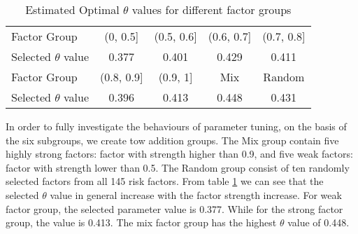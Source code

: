 \begin{table}[H]
	\centering
	\caption{Estimated Optimal $\theta$ values for different factor groups}
	\label{table:optimal_theta}
	\begin{tabular}{l|cccc}
		\hline
		\hline
		Factor Group            & (0, 0.5{]}   & (0.5, 0.6{]} & (0.6, 0.7{]} & (0.7, 0.8{]} \\ 
		Selected $\theta$ value & 0.377        & 0.401        & 0.429        & 0.411        \\ \hline
		Factor Group            & (0.8, 0.9{]} & (0.9, 1{]}   & Mix          & Random       \\ 
		Selected $\theta$ value & 0.396        & 0.413        & 0.448        & 0.431        \\ \hline
		\hline
	\end{tabular}
\end{table}
In order to fully investigate the behaviours of parameter tuning, on the basis of the six subgroups, we create tow addition groups.
The Mix group contain five highly strong factors: factor with strength higher than 0.9, and five weak factors: factor with strength lower than 0.5.
The Random group consist of ten randomly selected factors from all 145 risk factors.
From table \ref{table:optimal_theta} we can see that the selected $\theta$ value in general increase with the factor strength increase.
For weak factor group, the selected parameter value is 0.377.
While for the strong factor group, the value is 0.413.
The mix factor group has the highest $\theta$ value of 0.448.



